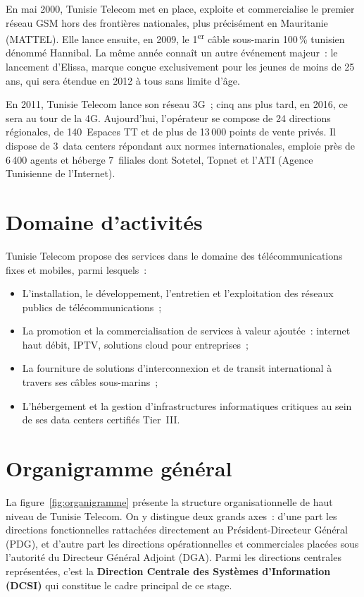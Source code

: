 \documentclass[12pt,a4paper]{report}
\begin{document}
En mai 2000, Tunisie Telecom met en place, exploite et commercialise le premier r\'eseau
GSM hors des fronti\`eres nationales, plus pr\'ecis\'ement en Mauritanie (MATTEL). Elle
lance ensuite, en 2009, le 1\textsuperscript{er} c\^able sous-marin 100\,\% tunisien
d\'enomm\'e Hannibal. La m\^eme ann\'ee conna\^it un autre \'ev\'enement majeur~: le
lancement d'Elissa, marque con\c cue exclusivement pour les jeunes de moins de 25 ans,
qui sera \'etendue en 2012 \`a tous sans limite d'\^age.

En 2011, Tunisie Telecom lance son r\'eseau 3G~; cinq ans plus tard, en 2016, ce sera au
tour de la 4G. Aujourd'hui, l'op\'erateur se compose de 24 directions r\'egionales, de
140~Espaces TT et de plus de 13\,000 points de vente priv\'es. Il dispose de
3~data centers r\'epondant aux normes internationales, emploie pr\`es de 6\,400 agents
et h\'eberge 7~filiales dont Sotetel, Topnet et l'ATI (Agence Tunisienne de l'Internet).

\section{Domaine d'activit\'es}

Tunisie Telecom propose des services dans le domaine des t\'el\'ecommunications fixes et
mobiles, parmi lesquels~:

\begin{itemize}[leftmargin=*]
  \item L'installation, le d\'eveloppement, l'entretien et l'exploitation des r\'eseaux
        publics de t\'el\'ecommunications~;
  \item La promotion et la commercialisation de services \`a valeur ajout\'ee~: internet
        haut d\'ebit, IPTV, solutions cloud pour entreprises~;
  \item La fourniture de solutions d'interconnexion et de transit international \`a
        travers ses c\^ables sous-marins~;
  \item L'h\'ebergement et la gestion d'infrastructures informatiques critiques au sein
        de ses data centers certifi\'es Tier~III.
\end{itemize}

\section{Organigramme g\'en\'eral}

La figure~\ref{fig:organigramme} pr\'esente la structure organisationnelle de haut niveau
de Tunisie Telecom. On y distingue deux grands axes~: d'une part les directions
fonctionnelles rattach\'ees directement au Pr\'esident-Directeur G\'en\'eral (PDG), et
d'autre part les directions op\'erationnelles et commerciales plac\'ees sous l'autorit\'e
du Directeur G\'en\'eral Adjoint (DGA). Parmi les directions centrales repr\'esent\'ees,
c'est la \textbf{Direction Centrale des Syst\`emes d'Information (DCSI)} qui constitue
le cadre principal de ce stage.
\end{document}
